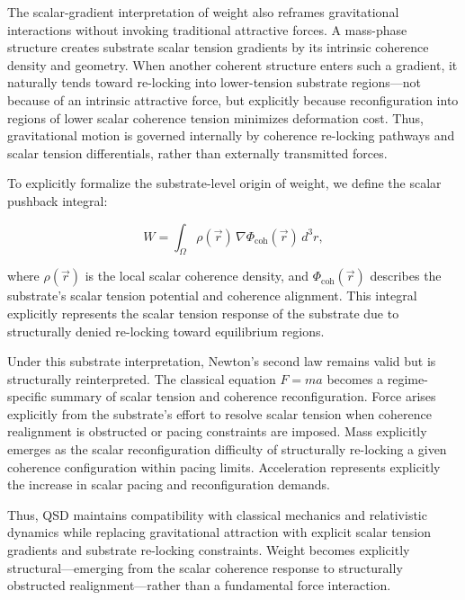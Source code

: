 \documentclass[preprints,article,submit,pdftex,moreauthors]{Definitions/mdpi}
\begin{document}
The scalar-gradient interpretation of weight also reframes gravitational interactions without invoking traditional attractive forces. A mass-phase structure creates substrate scalar tension gradients by its intrinsic coherence density and geometry. When another coherent structure enters such a gradient, it naturally tends toward re-locking into lower-tension substrate regions—not because of an intrinsic attractive force, but explicitly because reconfiguration into regions of lower scalar coherence tension minimizes deformation cost. Thus, gravitational motion is governed internally by coherence re-locking pathways and scalar tension differentials, rather than externally transmitted forces.

To explicitly formalize the substrate-level origin of weight, we define the scalar pushback integral:

\begin{equation}
    W = \int_{\Omega} \rho(\vec{r}) \, \nabla \Phi_{\text{coh}}(\vec{r}) \, d^3r,
\end{equation}

where \(\rho(\vec{r})\) is the local scalar coherence density, and \(\Phi_{\text{coh}}(\vec{r})\) describes the substrate's scalar tension potential and coherence alignment. This integral explicitly represents the scalar tension response of the substrate due to structurally denied re-locking toward equilibrium regions.

Under this substrate interpretation, Newton’s second law remains valid but is structurally reinterpreted. The classical equation \(F = ma\) becomes a regime-specific summary of scalar tension and coherence reconfiguration. Force arises explicitly from the substrate’s effort to resolve scalar tension when coherence realignment is obstructed or pacing constraints are imposed. Mass explicitly emerges as the scalar reconfiguration difficulty of structurally re-locking a given coherence configuration within pacing limits. Acceleration represents explicitly the increase in scalar pacing and reconfiguration demands.

Thus, QSD maintains compatibility with classical mechanics and relativistic dynamics while replacing gravitational attraction with explicit scalar tension gradients and substrate re-locking constraints. Weight becomes explicitly structural—emerging from the scalar coherence response to structurally obstructed realignment—rather than a fundamental force interaction.



\end{document}
